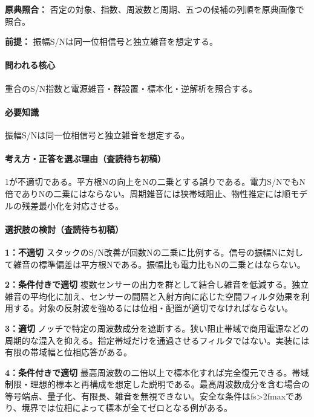 \noindent\textbf{原典照合：} 否定の対象、指数、周波数と周期、五つの候補の列順を原典画像で照合。\par

\noindent\textbf{前提：} 振幅S/Nは同一位相信号と独立雑音を想定する。\par

\paragraph{問われる核心} 重合のS/N指数と電源雑音・群設置・標本化・逆解析を照合する。

\paragraph{必要知識} 振幅S/Nは同一位相信号と独立雑音を想定する。

\paragraph{考え方・正答を選ぶ理由（査読待ち初稿）} 1が不適切である。平方根Nの向上をNの二乗とする誤りである。電力S/NでもN倍でありNの二乗にはならない。周期雑音には狭帯域阻止、物性推定には順モデルの残差最小化を対応させる。

\paragraph{選択肢の検討（査読待ち初稿）}\mbox{}\par

\noindent\textbf{1：不適切} スタックのS/N改善が回数Nの二乗に比例する。信号の振幅Nに対して雑音の標準偏差は平方根Nである。振幅比も電力比もNの二乗とはならない。\par

\noindent\textbf{2：条件付きで適切} 複数センサーの出力を群として結合し雑音を低減する。独立雑音の平均化に加え、センサーの間隔と入射方向に応じた空間フィルタ効果を利用する。対象の反射波を強めるには位相・配置が適切でなければならない。\par

\noindent\textbf{3：適切} ノッチで特定の周波数成分を遮断する。狭い阻止帯域で商用電源などの周期的な混入を抑える。指定帯域だけを通過させるフィルタではない。実装には有限の帯域幅と位相応答がある。\par

\noindent\textbf{4：条件付きで適切} 最高周波数の二倍以上で標本化すれば完全復元できる。帯域制限・理想的標本と再構成を想定した説明である。最高周波数成分を含む場合の等号端点、量子化、有限長、雑音を無視できない。安全な条件はfs>2fmaxであり、境界では位相によって標本が全てゼロとなる例がある。\par


